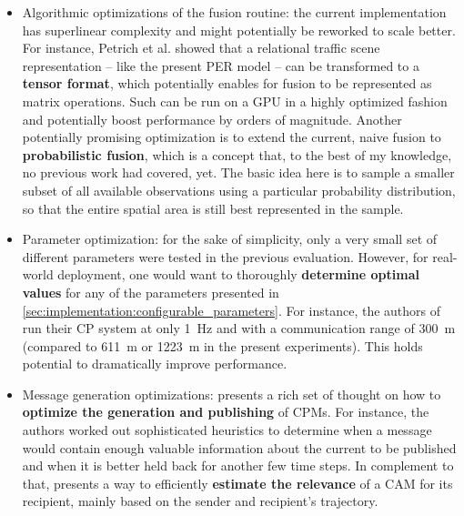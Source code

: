 \begin{itemize}
	\item Algorithmic optimizations of the fusion routine: the current implementation has superlinear complexity and might potentially be reworked to scale better. For instance, Petrich et al. \cite{Petrich2018} showed that a relational traffic scene representation – like the present PER model – can be transformed to a \textbf{tensor format}, which potentially enables for fusion to be represented as matrix operations. Such can be run on a GPU in a highly optimized fashion and potentially boost performance by orders of magnitude. Another potentially promising optimization is to extend the current, naive fusion to \textbf{probabilistic fusion}, which is a concept that, to the best of my knowledge, no previous work had covered, yet. The basic idea here is to sample a smaller subset of all available observations using a particular probability distribution, so that the entire spatial area is still best represented in the sample. 
	\item Parameter optimization: for the sake of simplicity, only a very small set of different parameters were tested in the previous evaluation. However, for real-world deployment, one would want to thoroughly \textbf{determine optimal values} for any of the parameters presented in \cref{sec:implementation:configurable_parameters}. For instance, the authors of \cite{Gunther2015} run their CP system at only \SI{1}{\hertz} and with a communication range of \SI{300}{\meter} (compared to \SI{611}{\meter} or \SI{1223}{\meter} in the present experiments). This holds potential to dramatically improve performance.
	\item Message generation optimizations: \cite{Thandavarayan2019} presents a rich set of thought on how to \textbf{optimize the generation and publishing} of CPMs. For instance, the authors worked out sophisticated heuristics to determine when a message would contain enough valuable information about the current to be published and when it is better held back for another few time steps. In complement to that, \cite{Breu2013} presents a way to efficiently \textbf{estimate the relevance} of a CAM for its recipient, mainly based on the sender and recipient's trajectory.
\end{itemize}
\par
\bigskip

